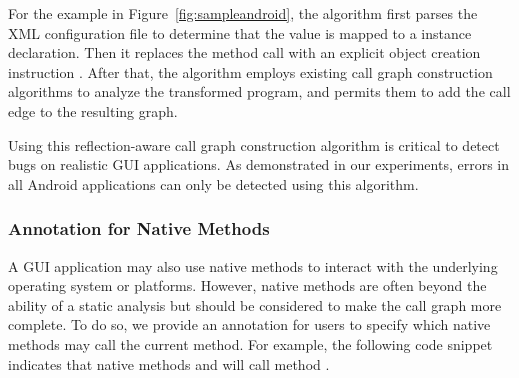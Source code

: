 For the example in Figure~\ref{fig:sampleandroid}, the algorithm
first parses the XML configuration file to determine that the 
value is mapped to a  instance declaration. Then it
replaces the  method call 
with an explicit object creation instruction .
After that, the algorithm employs existing call graph construction
algorithms to analyze the transformed program, and permits them
to add the call edge  to the resulting graph.

Using this reflection-aware call graph construction algorithm is
critical to detect bugs on realistic GUI applications.
As demonstrated in our experiments, errors in all Android applications
can only be detected using this algorithm.



\subsubsection{Annotation for Native Methods}

A GUI application may also use native methods to interact with the underlying
operating system or platforms. However, native methods are often
beyond the ability of a static analysis but should be considered to make
the call graph more complete. To do so, we provide an annotation 
for users to specify which native methods may call the current method. For example,
the following code snippet indicates that native methods  and 
will call method .

{}

